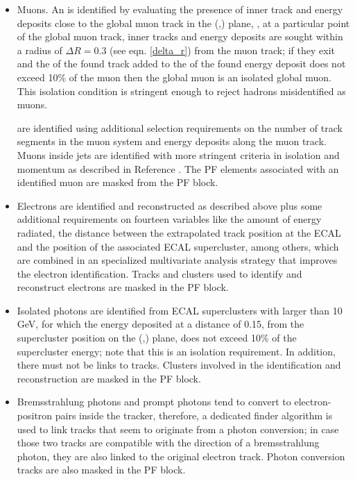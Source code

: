 \begin{itemize}

\item Muons. An  is identified by evaluating the presence of inner track and energy deposits close to the global muon track in the (\etac,\phic) plane, \ie, at a particular point of the global muon track, inner tracks and energy deposits are sought within a radius of $\Delta R=0.3$ (see eqn. \ref{delta_r}) from the muon track; if they exit and the \pt of the found track added to the \Et of the found energy deposit does not exceed 10\% of the muon \pt then the global muon is an isolated global muon. This isolation condition is stringent enough to reject hadrons misidentified as muons.

   are identified using additional selection requirements on the number of track segments in the muon system and energy deposits along the muon track. Muons inside jets are identified with more stringent criteria in isolation and momentum as described in Reference \cite{muon_req}. The PF elements associated with an identified muon are masked from the PF block.  

\item Electrons are identified and reconstructed as described above plus some additional requirements on fourteen variables like the amount of energy radiated, the distance between the extrapolated track position at the ECAL and the position of the associated ECAL supercluster, among others, which are combined in an specialized multivariate analysis strategy that improves the electron identification. Tracks and clusters used to identify and reconstruct electrons are masked in the PF block.  
  
\item Isolated photons are identified from ECAL superclusters with \Et larger than 10 GeV, for which the energy deposited at a distance of 0.15, from the supercluster position on the (\etac,\phic) plane, does not exceed 10\% of the supercluster energy; note that this is an isolation requirement. In addition, there must not be links to tracks. Clusters involved in the identification and reconstruction are masked in the PF block.

\item Bremsstrahlung photons and prompt photons tend to convert to electron-positron pairs inside the tracker, therefore, a dedicated finder algorithm is used to link tracks that seem to originate from a photon conversion; in case those two tracks are compatible with the direction of a bremsstrahlung photon, they are also linked to the original electron track. Photon conversion tracks are also masked in the PF block.


\end{itemize}
